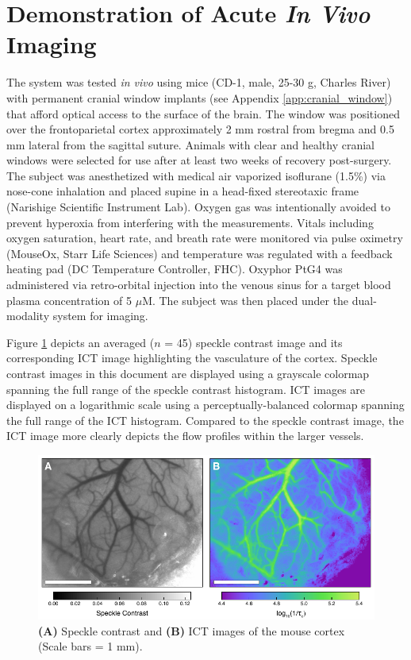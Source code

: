 \section{Demonstration of Acute \textit{In Vivo} Imaging} \label{sec:acutedemo}

The system was tested \textit{in vivo} using mice (CD-1, male, 25-30 g, Charles River) with permanent cranial window implants (see Appendix \ref{app:cranial_window}) that afford optical access to the surface of the brain. The window was positioned over the frontoparietal cortex approximately 2 mm rostral from bregma and 0.5 mm lateral from the sagittal suture. Animals with clear and healthy cranial windows were selected for use after at least two weeks of recovery post-surgery. The subject was anesthetized with medical air vaporized isoflurane (1.5\%) via nose-cone inhalation and placed supine in a head-fixed stereotaxic frame (Narishige Scientific Instrument Lab). Oxygen gas was intentionally avoided to prevent hyperoxia from interfering with the  measurements. Vitals including oxygen saturation, heart rate, and breath rate were monitored via pulse oximetry (MouseOx, Starr Life Sciences) and temperature was regulated with a feedback heating pad (DC Temperature Controller, FHC). Oxyphor PtG4 was administered via retro-orbital injection into the venous sinus for a target blood plasma concentration of 5 $\mu$M. The subject was then placed under the dual-modality system for imaging.

Figure \ref{fig:staticspeckle} depicts an averaged ($n$ = 45) speckle contrast image and its corresponding ICT image highlighting the vasculature of the cortex. Speckle contrast images in this document are displayed using a grayscale colormap spanning the full range of the speckle contrast histogram. ICT images are displayed on a logarithmic scale using a perceptually-balanced colormap \cite{Niccoli:vx} spanning the full range of the ICT histogram. Compared to the speckle contrast image, the ICT image more clearly depicts the flow profiles within the larger vessels.

\begin{figure}
    \includegraphics{figures/chapter_2/staticspeckle.pdf}
    \caption{
        \label{fig:staticspeckle}
        \textbf{(A)} Speckle contrast and \textbf{(B)} ICT images of the mouse cortex (Scale bars = 1 mm).
    }
\end{figure}


